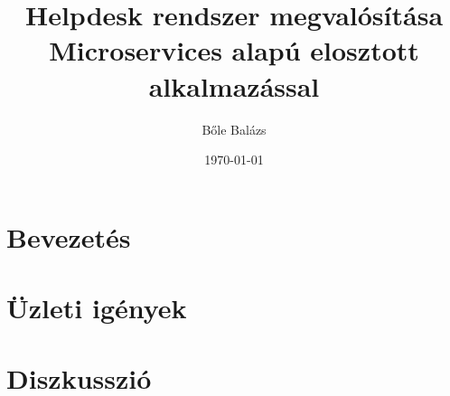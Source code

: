 


\title{Helpdesk rendszer megvalósítása Microservices alapú elosztott alkalmazással}
\author{Bőle Balázs}
\date{\today}
\graphicspath{{Figs/}}  %


\sloppy
{}
\makeatletter  %

\makeatother

\clearpage


\pagestyle{front}
\tableofcontents

\begingroup
\let\clearpage\relax
\listoffigures
\endgroup


\clearpage
{}
\chapter*{Bevezetés}\label{ch:bevezetes}

\lipsum


\chapter{Üzleti igények}\label{ch:uzleti_igenyek}
\pagestyle{main}

\lipsum


\chapter*{Diszkusszió}\label{ch:diszkusszió}
\pagestyle{plain}




\newpage









